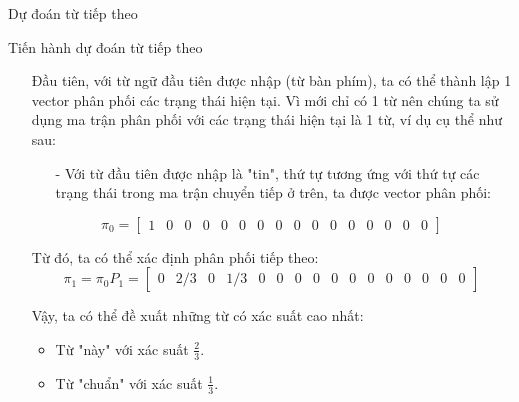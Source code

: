 \begin{frame}{Dự đoán từ tiếp theo}
\begin{LARGE}
    Tiến hành dự đoán từ tiếp theo   \par
\end{LARGE}
\begin{itemize}
    \item[\bullet] Đầu tiên, với từ ngữ đầu tiên được nhập (từ bàn phím), ta có thể thành lập 1 vector phân phối các trạng thái hiện tại. Vì mới chỉ có 1 từ nên chúng ta sử dụng ma trận phân phối với các trạng thái hiện tại là 1 từ, ví dụ cụ thể như sau:
    \begin{itemize}
        \item[-] Với từ đầu tiên được nhập là "tin", thứ tự tương ứng với thứ tự các trạng thái trong ma trận chuyển tiếp ở trên, ta được vector phân phối:
    \end{itemize}
    $$
    \pi_0 = 
    \begin{bmatrix}
        1 & 0 & 0 & 0 & 0 & 0 & 0 & 0 & 0 & 0 & 0 & 0 & 0 & 0 & 0 & 0 
    \end{bmatrix} 
    $$
    
    
    \item[\bullet] Từ đó, ta có thể xác định phân phối tiếp theo:
    $$ \pi_1 = \pi_0 P_1 = 
    \begin{bmatrix}
        0 & 2/3 & 0 & 1/3 & 0 & 0 & 0 & 0 & 0 & 0 & 0 & 0 & 0 & 0 & 0 & 0 
    \end{bmatrix}
    $$
    \item[\bullet] Vậy, ta có thể đề xuất những từ có xác suất cao nhất:
    \begin{itemize}
        \item Từ "này" \space với xác suất $\frac{2}{3}.$
        \item Từ "chuẩn" \space với xác suất $\frac{1}{3}.$
        
    \end{itemize}
\end{itemize}
\end{frame}

